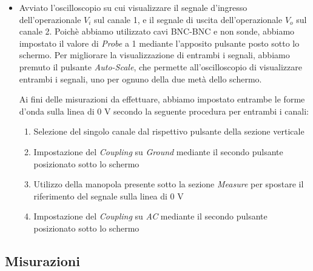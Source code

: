 \begin{itemize}
    \item Avviato l'oscilloscopio su cui visualizzare il segnale d'ingresso dell'operazionale $V_i$ sul canale 1, e il segnale di uscita dell'operazionale $V_o$ sul canale 2.
    Poichè abbiamo utilizzato cavi BNC-BNC e non sonde, abbiamo impostato il valore di \emph{Probe} a 1 mediante l'apposito pulsante posto sotto lo schermo.
    Per migliorare la visualizzazione di entrambi i segnali, abbiamo premuto il pulsante \emph{Auto-Scale}, che permette all'oscilloscopio di visualizzare entrambi i segnali, uno per ognuno della due metà dello schermo.
    
    Ai fini delle misurazioni da effettuare, abbiamo impostato entrambe le forme d'onda sulla linea di 0 V secondo la seguente procedura per entrambi i canali:
    \begin{enumerate}
        \item Selezione del singolo canale dal rispettivo pulsante della sezione verticale
        \item Impostazione del \emph{Coupling} su \textit{Ground} mediante il secondo pulsante posizionato sotto lo schermo
        \item Utilizzo della manopola presente sotto la sezione \textit{Measure} per spostare il riferimento del segnale sulla linea di 0 V
        \item Impostazione del \emph{Coupling} su \textit{AC} mediante il secondo pulsante posizionato sotto lo schermo  
\end{enumerate}
\end{itemize}


\subsection{Misurazioni}
